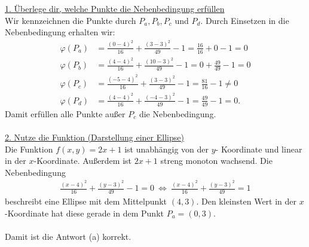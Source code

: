 \underline{1. Überlege dir, welche Punkte die Nebenbedingung erfüllen}\\
Wir kennzeichnen die Punkte durch $ P_a, P_b , P_c$ und $ P_d $.
Durch Einsetzen in die Nebenbedingung erhalten wir:
\begin{align*}
	\varphi(P_a) 
	&= 
	\frac{(0-4)^2}{16} + \frac{(3-3)^2}{49} -1
	=
	\frac{16}{16} + 0 - 1 = 0\\
	\varphi(P_b)
	&=
	\frac{(4-4)^2}{16} + \frac{(10-3)^2}{49} -1
	=
	0 + \frac{49}{49} -1 = 0\\
	\varphi(P_c)
	&=
	\frac{(-5-4)^2}{16} + \frac{(3-3)^2}{49} -1
	=
	\frac{81}{16} - 1 \neq 0\\
	\varphi(P_d)
	&=
	\frac{(4-4)^2}{16} + \frac{(-4-3)^2}{49} -1
	=
	\frac{49}{49 } -1 = 0.
\end{align*}
Damit erfüllen alle Punkte außer $ P_c $ die Nebenbedingung.\\
\\
\underline{2. Nutze die Funktion (Darstellung einer Ellipse)}\\
Die Funktion $ f(x,y) = 2x + 1 $ ist unabhängig von der $ y $- Koordinate und linear in der $ x $-Koordinate.
Außerdem ist $ 2x + 1$ streng monoton wachsend.
Die Nebenbedingung
\begin{align*}
	\frac{(x-4)^2}{16} + \frac{(y-3)^2}{49} -1 = 0 
	\ \Leftrightarrow \
	\frac{(x-4)^2}{16} + \frac{(y-3)^2}{49} = 1
\end{align*}
beschreibt eine Ellipse mit dem Mittelpunkt $ (4,3) $. 
Den kleinsten Wert in der $ x $-Koordinate hat diese gerade in dem Punkt $ P_a = (0,3) $.\\
\\
Damit ist die Antwort (a) korrekt. 


\newpage

